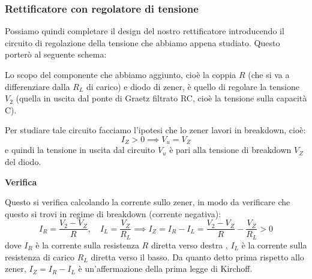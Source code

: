 \documentclass[a4paper,11pt]{article}
\begin{document}
\subsubsection{Rettificatore con regolatore di tensione}
Possiamo quindi completare il design del nostro rettificatore introducendo il circuito di regolazione della tensione che abbiamo appena studiato. Questo porterò al seguente schema:
\begin{center}
\end{center}

Lo scopo del componente che abbiamo aggiunto, cioè la coppia $R$ (che si va a differenziare dalla $R_L$ di carico) e diodo di zener, è quello di regolare la tensione $V_2$ (quella in uscita dal ponte di Graetz filtrato RC, cioè la tensione sulla capacità C).

Per studiare tale circuito facciamo l'ipotesi che lo zener lavori in breakdown, cioè:
$$
I_Z > 0 \implies V_u = V_Z
$$
e quindi la tensione in uscita dal circuito $V_u$ è pari alla tensione di breakdown $V_Z$ del diodo.

\par\smallskip

\noindent
\textbf{\textsf{Verifica}}

\noindent
Questo si verifica calcolando la corrente sullo zener, in modo da verificare che questo si trovi in regime di breakdown (corrente negativa):
$$
I_R = \frac{V_2 - V_Z}{R}, \quad I_L = \frac{V_Z}{R_L} \implies I_Z = I_R - I_L = \frac{V_2 - V_Z}{R} - \frac{V_Z}{R_L} > 0
$$
dove $I_R$ è la corrente sulla resistenza $R$ diretta verso destra , $I_L$ è la corrente sulla resistenza di carico $R_L$ diretta verso il basso. Da quanto detto prima rispetto allo zener, $I_Z = I_R - I_L$ è un'affermazione della prima legge di Kirchoff.
\end{document}
